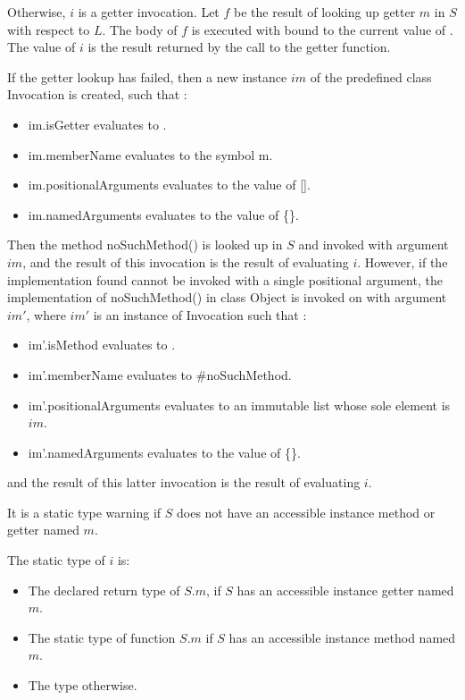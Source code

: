 \documentclass{article}
\newcommand{\code}[1]{{\sf #1}}
\begin{document}
\LMHash{}
 Otherwise, $i$ is a getter invocation.  Let $f$ be the result of  looking up getter $m$ in $S$  with respect to $L$.  The body of $f$  is executed with \THIS{} bound to the current value of  \THIS{}.  The value of $i$ is the result returned by the call to the getter function. 

\LMHash{}
If the getter lookup has failed, then a new instance $im$  of the predefined class  \code{Invocation}  is created, such that :
\begin{itemize}
\item  \code{im.isGetter} evaluates to \code{\TRUE{}}.
\item  \code{im.memberName} evaluates to the symbol \code{m}.
\item \code{im.positionalArguments} evaluates to the value of \code{\CONST{} []}.
\item \code{im.namedArguments} evaluates to the value of \code{\CONST{} \{\}}.
\end{itemize}
Then the method \code{noSuchMethod()} is looked up in $S$ and invoked  with argument $im$, and the result of this invocation is the result of evaluating $i$. However, if the implementation found cannot be invoked with a single positional argument, the implementation  of \code{noSuchMethod()} in class \code{Object} is invoked on \THIS{} with argument $im'$, where $im'$ is an instance of \code{Invocation} such that :
\begin{itemize}
\item  \code{im'.isMethod} evaluates to \code{\TRUE{}}.
\item  \code{im'.memberName} evaluates to \code{\#noSuchMethod}.
\item \code{im'.positionalArguments} evaluates to an immutable list whose sole element is  $im$.
\item \code{im'.namedArguments} evaluates to the value of \code{\CONST{} \{\}}.
\end{itemize}
and the result of this latter invocation is the result of evaluating $i$.

\LMHash{}
It is a static type warning if $S$ does not have an accessible instance method or getter named $m$.  

The static type of $i$ is:
\begin{itemize}
\item The declared return type of $S.m$, if $S$ has an accessible instance getter named $m$.
\item The static type of function $S.m$ if $S$ has an accessible instance method named $m$.
\item The type  \DYNAMIC{} otherwise. 
\end{itemize}
\end{document}
